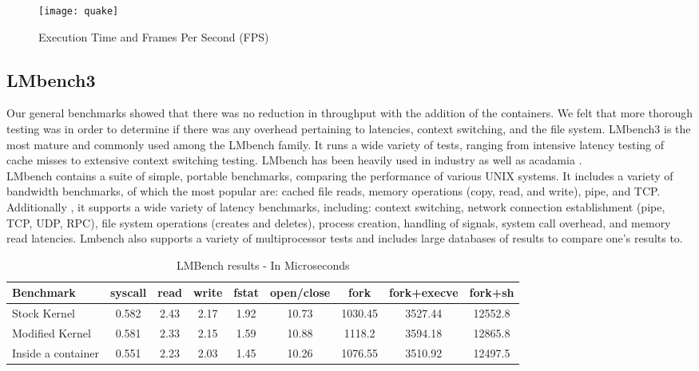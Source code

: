 \begin{figure}[tbh]
\centering
\texttt{[image: quake]}
\caption{Execution Time and Frames Per Second (FPS)}
\label{fig:Quake}
\end{figure}

\subsection{LMbench3}
Our general benchmarks showed that there was no reduction in throughput with the addition of the containers.  We felt that more thorough testing was in order to determine if there was any overhead pertaining to latencies, context switching, and the file system.  LMbench3 is the most mature and commonly used among the LMbench family.  It runs a wide variety of tests, ranging from intensive latency testing of cache misses to extensive context switching testing.  LMbench has been heavily used in industry as well as acadamia \cite{lmbench}. \\

LMbench contains a suite of simple, portable benchmarks, comparing the performance of various UNIX systems.  It includes a variety of bandwidth benchmarks, of which the most popular are: cached file reads, memory operations (copy, read, and write), pipe, and TCP.  Additionally , it supports a wide variety of latency benchmarks, including: context switching, network connection establishment (pipe, TCP, UDP, RPC), file system operations (creates and deletes), process creation, handling of signals, system call overhead, and memory read latencies.  Lmbench also supports a variety of multiprocessor tests and includes large databases of results to compare one's results to. \cite{lmbench_paper}

\begin{table}[htb]
{\small
\hfill{}
\begin{tabular}{|l|c|c|c|c|c|c|c|c|}
\hline Benchmark & syscall & read & write & fstat & open/close & fork & fork+execve & fork+sh \\ 
\hline
Stock Kernel & 0.582 & 2.43 & 2.17 & 1.92 & 10.73 & 1030.45 & 3527.44 & 12552.8 \\
Modified Kernel & 0.581 & 2.33 & 2.15 & 1.59 & 10.88 & 1118.2 & 3594.18 & 12865.8 \\
Inside a container & 0.551 & 2.23 & 2.03 & 1.45 & 10.26 & 1076.55 & 3510.92 & 12497.5 \\ 
\hline 
\end{tabular}}
\hfill{}
\caption{ LMBench results - In Microseconds }
\label{tab:lmbench_results}
\end{table}

